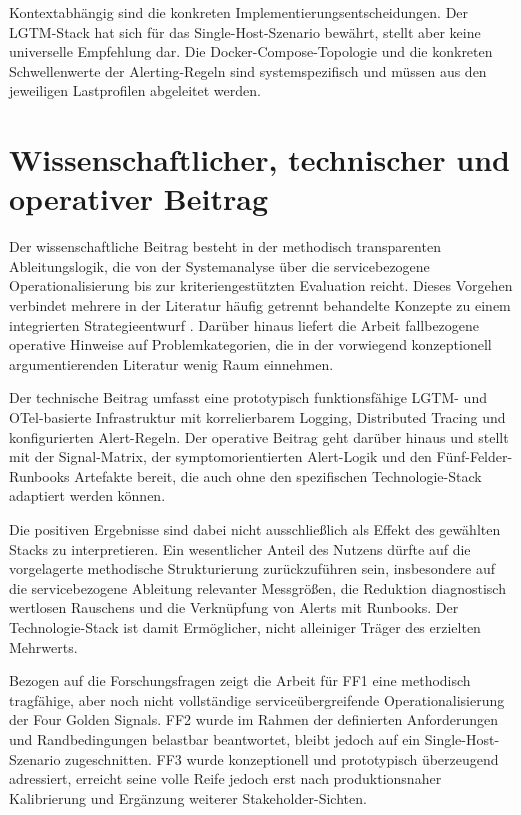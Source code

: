 Kontextabhängig sind die konkreten Implementierungsentscheidungen. Der LGTM-Stack hat sich für das Single-Host-Szenario bewährt, stellt aber keine universelle Empfehlung dar. Die Docker-Compose-Topologie und die konkreten Schwellenwerte der Alerting-Regeln sind systemspezifisch und müssen aus den jeweiligen Lastprofilen abgeleitet werden.
 
 
\section{Wissenschaftlicher, technischer und operativer Beitrag}
 
Der wissenschaftliche Beitrag besteht in der methodisch transparenten Ableitungslogik, die von der Systemanalyse über die servicebezogene Operationalisierung bis zur kriteriengestützten Evaluation reicht. Dieses Vorgehen verbindet mehrere in der Literatur häufig getrennt behandelte Konzepte zu einem integrierten Strategieentwurf \parencite[S.~50]{pappula2021building}. Darüber hinaus liefert die Arbeit fallbezogene operative Hinweise auf Problemkategorien, die in der vorwiegend konzeptionell argumentierenden Literatur wenig Raum einnehmen.
 
Der technische Beitrag umfasst eine prototypisch funktionsfähige LGTM- und OTel-basierte Infrastruktur mit korrelierbarem Logging, Distributed Tracing und konfigurierten Alert-Regeln. Der operative Beitrag geht darüber hinaus und stellt mit der Signal-Matrix, der symptomorientierten Alert-Logik und den Fünf-Felder-Runbooks Artefakte bereit, die auch ohne den spezifischen Technologie-Stack adaptiert werden können.
 
Die positiven Ergebnisse sind dabei nicht ausschließlich als Effekt des gewählten Stacks zu interpretieren. Ein wesentlicher Anteil des Nutzens dürfte auf die vorgelagerte methodische Strukturierung zurückzuführen sein, insbesondere auf die servicebezogene Ableitung relevanter Messgrößen, die Reduktion diagnostisch wertlosen Rauschens und die Verknüpfung von Alerts mit Runbooks. Der Technologie-Stack ist damit Ermöglicher, nicht alleiniger Träger des erzielten Mehrwerts.
 
Bezogen auf die Forschungsfragen zeigt die Arbeit für FF1 eine methodisch tragfähige, aber noch nicht vollständige serviceübergreifende Operationalisierung der Four Golden Signals. FF2 wurde im Rahmen der definierten Anforderungen und Randbedingungen belastbar beantwortet, bleibt jedoch auf ein Single-Host-Szenario zugeschnitten. FF3 wurde konzeptionell und prototypisch überzeugend adressiert, erreicht seine volle Reife jedoch erst nach produktionsnaher Kalibrierung und Ergänzung weiterer Stakeholder-Sichten.